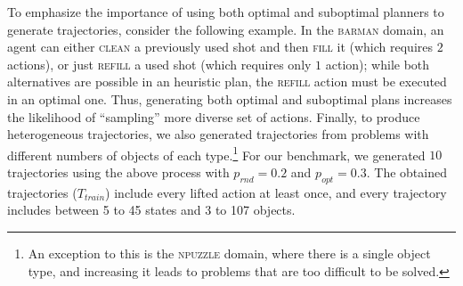 \documentclass[letterpaper]{article} %
\newcommand{\T}{T}
\newcommand{\Ttrain}{\T_{\textit{train}}}
\newif\ifaddcomments
\newcommand{\roni}[1]{\ifaddcomments{\textcolor{red}{[Roni: #1]}}\fi}
\newcommand{\leo}[1]{\ifaddcomments{\textcolor{pink}{[Leonardo: #1]}}\fi}
\begin{document}
To emphasize the importance of using both optimal and suboptimal planners to generate trajectories, consider the following example. 
In the \textsc{barman} domain, an agent can either \textsc{clean} a previously used shot and then \textsc{fill} it (which requires $2$ actions), or just \textsc{refill} a used shot (which requires only $1$ action); while both alternatives are possible in an heuristic plan, the \textsc{refill} action must be executed in an optimal one. 
Thus, generating both optimal and suboptimal plans increases the likelihood of ``sampling'' more diverse set of actions. 
Finally, to produce heterogeneous trajectories, we also generated trajectories from problems with different numbers of objects of each type.\footnote{An exception to this is the \textsc{npuzzle} domain, where there is a single object type, and increasing it leads to problems that are too difficult to be solved.} 
%
For our benchmark, we generated $10$ trajectories using the above process with $p_{rnd}=0.2$ and $p_{opt}=0.3$. 
The obtained trajectories ($\Ttrain$) include every lifted action at least once, and every trajectory includes between 5 to 45 states and 3 to 107 objects. %





\end{document}
